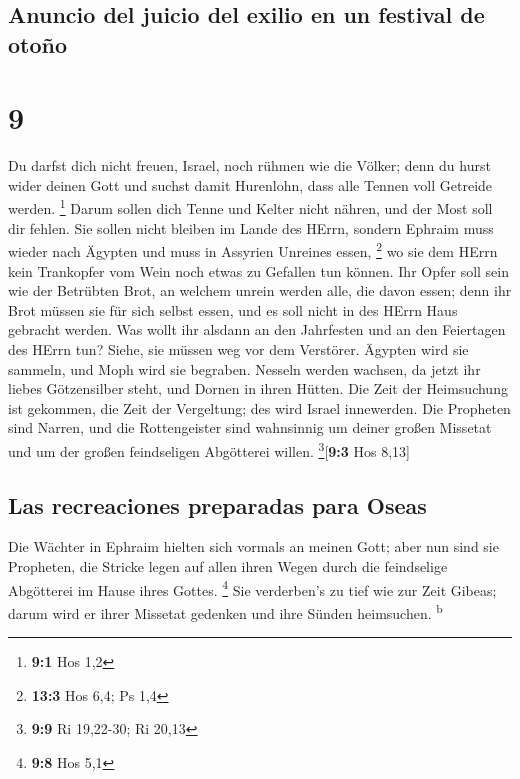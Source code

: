 \hypertarget{anuncio-del-juicio-del-exilio-en-un-festival-de-otouxf1o}{%
\subsection{Anuncio del juicio del exilio en un festival de
otoño}\label{anuncio-del-juicio-del-exilio-en-un-festival-de-otouxf1o}}

\hypertarget{section-8}{%
\section{9}\label{section-8}}

 Du darfst dich nicht freuen, Israel, noch rühmen wie die
Völker; denn du hurst wider deinen Gott und suchst damit Hurenlohn, dass
alle Tennen voll Getreide werden. \footnote{\textbf{9:1} Hos 1,2}
 Darum sollen dich Tenne und Kelter nicht nähren, und der
Most soll dir fehlen.  Sie sollen nicht bleiben im Lande
des HErrn, sondern Ephraim muss wieder nach Ägypten und muss in Assyrien
Unreines essen, \footnote{\textbf{13:3} Hos 6,4; Ps 1,4} 
wo sie dem HErrn kein Trankopfer vom Wein noch etwas zu Gefallen tun
können. Ihr Opfer soll sein wie der Betrübten Brot, an welchem unrein
werden alle, die davon essen; denn ihr Brot müssen sie für sich selbst
essen, und es soll nicht in des HErrn Haus gebracht werden.
 Was wollt ihr alsdann an den Jahrfesten und an den
Feiertagen des HErrn tun?  Siehe, sie müssen weg vor dem
Verstörer. Ägypten wird sie sammeln, und Moph wird sie begraben. Nesseln
werden wachsen, da jetzt ihr liebes Götzensilber steht, und Dornen in
ihren Hütten.  Die Zeit der Heimsuchung ist gekommen, die
Zeit der Vergeltung; des wird Israel innewerden. Die Propheten sind
Narren, und die Rottengeister sind wahnsinnig um deiner großen Missetat
und um der großen feindseligen Abgötterei willen.
\footnote{\textbf{9:9} Ri 19,22-30; Ri 20,13}{[}\textbf{9:3} Hos 8,13{]}

\hypertarget{las-recreaciones-preparadas-para-oseas}{%
\subsection{Las recreaciones preparadas para
Oseas}\label{las-recreaciones-preparadas-para-oseas}}

 Die Wächter in Ephraim hielten sich vormals an meinen
Gott; aber nun sind sie Propheten, die Stricke legen auf allen ihren
Wegen durch die feindselige Abgötterei im Hause ihres Gottes.
\footnote{\textbf{9:8} Hos 5,1}  Sie verderben's zu tief
wie zur Zeit Gibeas; darum wird er ihrer Missetat gedenken und ihre
Sünden heimsuchen. \textsuperscript{b}

